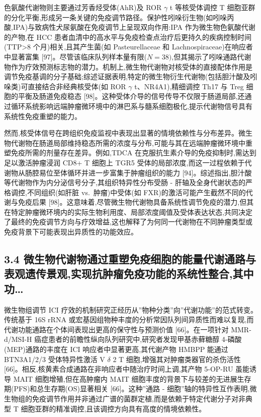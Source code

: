\documentclass[11pt]{article}
\begin{document}
色氨酸代谢物则主要通过芳香烃受体(AhR)及 ROR \(\gamma\) t 等核受体调控 T 细胞亚群的分化平衡,形成另一条关键的免疫调节路径。保护性吲哚衍生物(如吲哚丙酸,IPA)与致病性犬尿氨酸在免疫调节上呈现双向作用:IPA 作为微生物色氨酸代谢的产物,在 HCC 患者血清中的高水平与免疫检查点治疗后更持久的疾病控制时间(TTP\textgreater8 个月)相关,且其产生菌(如 Pasteurellaceae 和 Lachnospiraceae)在响应者中显著富集 {[}97{]}。尽管该临床队列样本量有限(\(N=38)\),但其揭示了吲哚通路代谢物作为疗效预测标志物的潜力。机制上,微生物代谢物对核受体的直接配体作用是调节免疫基调的分子基础;综述证据表明,特定的微生物衍生代谢物(包括胆汁酸及吲哚类)可直接结合非经典核受体(如 ROR \(\gamma\) t、NR4A1),精细调控 Th17 与 Treg 细胞的平衡及肠道免疫稳态 {[}98{]}。这种受体介导的信号传导不仅限于肠道局部,还通过循环系统影响远端肿瘤微环境中的淋巴系与髓系细胞极化,提示代谢物信号具有系统性免疫重塑的能力。

然而,核受体信号在跨组织免疫监视中表现出显著的情境依赖性与分布差异。微生物代谢物在肠道局部维持稳态所需的浓度与分布,可能与其在远端肿瘤微环境中重塑免疫所需的剂量存在差异。例如,TDCA 在克服抗生素介导的免疫抑制时,需达到足以激活肿瘤浸润 CD8+ T 细胞上 TGR5 受体的局部浓度,而这一过程依赖于代谢物从肠腔易位至体循环并进一步富集于肿瘤组织的能力 {[}94{]}。综述指出,胆汁酸等代谢物作为内分泌信号分子,其组织特异性分布受肠 - 肝轴及全身代谢状态的严格调控,不同组织(如肝脏 vs.~肿瘤)中受体(如 FXR)的激活可能产生截然不同的代谢与免疫后果 {[}98{]}。这意味着,尽管微生物代谢物具备系统性调节免疫的潜力,但其在特定肿瘤微环境内的实际生物利用度、局部浓度阈值及受体表达状态,共同决定了最终的免疫调节方向与疗效增益,这也解释了为何同一代谢物在不同肿瘤类型或免疫背景下可能表现出异质性的功能效应。

\subsection{3.4 微生物代谢物通过重塑免疫细胞的能量代谢通路与表观遗传景观,实现抗肿瘤免疫功能的系统性整合,其中功\ldots{}}\label{ux5faeux751fux7269ux4ee3ux8c22ux7269ux901aux8fc7ux91cdux5851ux514dux75abux7ec6ux80deux7684ux80fdux91cfux4ee3ux8c22ux901aux8defux4e0eux8868ux89c2ux9057ux4f20ux666fux89c2ux5b9eux73b0ux6297ux80bfux7624ux514dux75abux529fux80fdux7684ux7cfbux7edfux6027ux6574ux5408ux5176ux4e2dux529f}

微生物组调节 ICI 疗效的机制研究正经历从''物种分类''向''代谢功能''的范式转变。传统基于 16S rRNA 或宏基因组物种丰度的分析常因队列间异质性而难以复现,而代谢功能通路在个体间表现出更高的保守性与预测价值 {[}66{]}。在一项针对 MMR-d/MSI-H 癌症患者的前瞻性纵向队列研究中,研究者发现甲基赤藓糖醇 4-磷酸(MEP)通路的丰度在 ICI 响应者中显著更高,其代谢产物 HMBPP 能通过 BTN3A1/2/3 受体特异性激活 V \(\delta\) 2 T 细胞,增强其对肿瘤类器官的杀伤活性 {[}66{]}。相反,核黄素合成通路在非响应者中随治疗时间上调,其产物 5-OP-RU 虽能诱导 MAIT 细胞增殖,但在高肿瘤内 MAIT 细胞丰度的背景下与较差的无进展生存期(PFS)和总生存期(OS)显著相关 {[}66{]}。这种''通路 - 细胞''轴的特异性互作表明,微生物组的免疫调节作用并非通过广谱的菌群定植,而是依赖于特定代谢分子对非典型 T 细胞亚群的精准调控,且该调控方向具有高度的情境依赖性。
\end{document}
